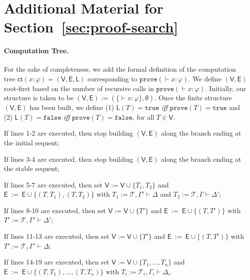 \documentclass[copyright,creativecommons]{eptcs}
\newcommand{\tel}{\mathcal{T}}
\newcommand{\iffi}{\textit{iff} }
\renewcommand{\phi}{\varphi}
\newcommand{\sar}{\vdash}
\newcommand{\tseq}{T} %
\newcommand{\true}{\mathtt{true}}
\newcommand{\false}{\mathtt{false}}
\newcommand{\prove}{\mathtt{prove}}
\newcommand{\set}[1]{\{#1\}}
\newcommand{\ct}{\mathsf{ct}}
\newcommand{\ctv}{\mathsf{V}}
\newcommand{\cte}{\mathsf{E}}
\newcommand{\ctl}{\mathsf{L}}
\newcommand{\tval}{\true} %
\newcommand{\fval}{\false} %
\begin{document}
\appendix




\section{Additional Material for Section~\ref{sec:proof-search}}\label{app:extra-material-sec-proof-search}

\paragraph{Computation Tree.} For the sake of completeness, we add the formal definition of the computation tree $\ct(x : \phi) = (\ctv,\cte,\ctl)$ corresponding to $\prove(\sar x : \phi)$. We define $(\ctv,\cte)$ root-first based on the number of recursive calls in $\prove(\sar x : \phi)$. Initially, our structure is taken to be $(\ctv,\cte) := (\set{\sar x : \phi},\emptyset)$. Once the finite structure $(\ctv,\cte)$ has been built, we define (1) $\ctl(\tseq) = \tval$ \iffi $\prove(\tseq) = \true$ and (2) $\ctl(\tseq) = \fval$ \iffi $\prove(\tseq) = \false$,  for all $\tseq \in \ctv$.
\begin{description}[leftmargin=!, labelwidth=0em, labelsep=.25em]

\item[$\bullet$] If lines 1-2 are executed, then stop building $(\ctv,\cte)$ along the branch ending at the initial sequent;

\item[$\bullet$] If lines 3-4 are executed, then stop building $(\ctv,\cte)$ along the branch ending at the stable sequent;

\item[$\bullet$] If lines 5-7 are executed, then set $\ctv := \ctv \cup \set{\tseq_{1},\tseq_{2}}$ and $\cte \ := \ \cte \cup \set{(\tseq,\tseq_{1}),(\tseq,\tseq_{2})}$ with $\tseq_{1} := \tel,\Gamma' \sar \Delta$ and $\tseq_{2} := \tel,\Gamma \sar \Delta'$;

\item[$\bullet$] If lines 8-10 are executed, then set $\ctv := \ctv \cup \set{\tseq'}$ and $\cte \ := \ \cte \cup \set{(\tseq,\tseq')}$ with $\tseq' := \tel,\Gamma' \sar \Delta'$;

\item[$\bullet$] If lines 11-13 are executed, then set $\ctv := \ctv \cup \set{\tseq'}$ and $\cte \ := \ \cte \cup \set{(\tseq,\tseq')}$ with $\tseq' := \tel,\Gamma' \sar \Delta$;

\item[$\bullet$] If lines 14-19 are executed, then set $\ctv := \ctv \cup \set{\tseq_{1}, \ldots, \tseq_{n}}$ and $\cte \ := \ \cte \cup \set{(\tseq,\tseq_{1}), \ldots, (\tseq,\tseq_{n})}$ with $\tseq_{i} := \tel_{i},\Gamma_{i} \sar \Delta_{i}$.

\end{description}
\end{document}
